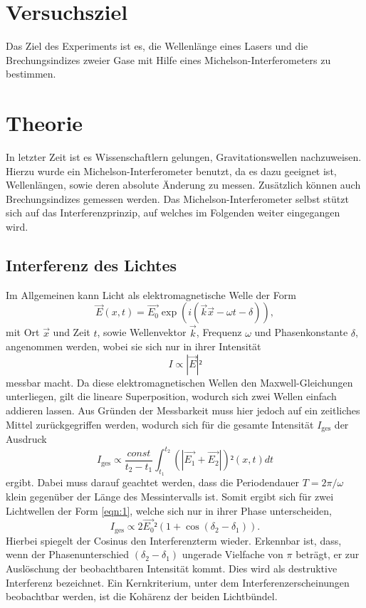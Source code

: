 \section{Versuchsziel}
\label{sec:Versuchsziel}
Das Ziel des Experiments ist es, die Wellenlänge eines Lasers und die Brechungsindizes zweier Gase mit Hilfe eines Michelson-Interferometers zu bestimmen.

\section{Theorie}
\label{sec:Theorie}

In letzter Zeit ist es Wissenschaftlern gelungen, Gravitationswellen nachzuweisen.
Hierzu wurde ein Michelson-Interferometer benutzt, da es dazu geeignet ist, Wellenlängen, sowie deren absolute Änderung zu messen.
Zusätzlich können auch Brechungsindizes gemessen werden.
Das Michelson-Interferometer selbst stützt sich auf das Interferenzprinzip, auf welches im Folgenden weiter eingegangen wird.\\
\subsection{Interferenz des Lichtes}
Im Allgemeinen kann Licht als elektromagnetische Welle der Form
\begin{equation}
  \vec{E}(x,t) = \vec{E_0}\exp{(i(\vec{k}\vec{x}-\omega t -\delta))}, \label{eqn:1}
\end{equation}
mit Ort $\vec{x}$ und Zeit $t$, sowie Wellenvektor $\vec{k}$, Frequenz $\omega$ und Phasenkonstante $\delta$, angenommen werden, wobei sie sich nur in ihrer Intensität
\begin{equation}
  I \propto |\vec{E}|²
\end{equation}
messbar macht.
Da diese elektromagnetischen Wellen den Maxwell-Gleichungen unterliegen, gilt die lineare Superposition, wodurch sich zwei Wellen einfach addieren lassen.
Aus Gründen der Messbarkeit muss hier jedoch auf ein zeitliches Mittel zurückgegriffen werden, wodurch sich für die gesamte Intensität $I_{\text{ges}}$ der Ausdruck
\begin{equation}
  I_{\text{ges}} \propto \frac{const}{t_2-t_1} \int_{t_1}^{t_2} (|\vec{E_1}+\vec{E_2}|)²(x,t) dt
\end{equation}
ergibt. Dabei muss darauf geachtet werden, dass die Periodendauer $T = 2\pi/\omega$ klein gegenüber der Länge des Messintervalls ist.
Somit ergibt sich für zwei Lichtwellen der Form \eqref{eqn:1}, welche sich nur in ihrer Phase unterscheiden,
\begin{equation}
  I_{\text{ges}} \propto 2\vec{E_0}²(1+\cos{(\delta_2-\delta_1)}).
\end{equation}
Hierbei spiegelt der Cosinus den Interferenzterm wieder.
Erkennbar ist, dass, wenn der Phasenunterschied $(\delta_2-\delta_1)$ ungerade Vielfache von $\pi$ beträgt, er zur Auslöschung der beobachtbaren Intensität kommt.
Dies wird als destruktive Interferenz bezeichnet.
Ein Kernkriterium, unter dem Interferenzerscheinungen beobachtbar werden, ist die Kohärenz der beiden Lichtbündel.\\

